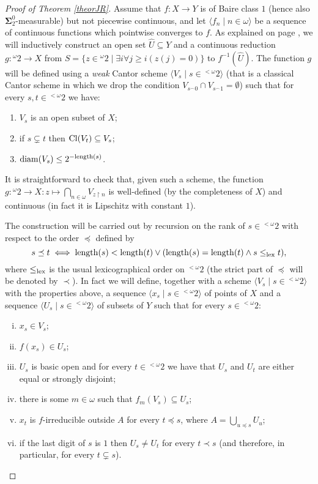 \documentclass{rae}
\def\leng{{\rm length}}
\def\diam{{\rm diam}}
\def\Cl{{\rm Cl}}
\newcommand{\Can}{\ensuremath{{}^\omega 2}}
\newcommand{\conc}{{}^\smallfrown}
\newcommand{\bSigma}{\mathbf{\Sigma}}
\newcommand{\restr}[2]{#1 \restriction #2}
\newcommand{\seq}[2]{\langle #1 \mid  #2 \rangle}
\theoremstyle{definition}
\begin{document}
\begin{proof}[Proof of Theorem \ref{theorJR}]
Assume that $f\colon X \to Y$ is of Baire class $1$ (hence also 
$\bSigma^0_2$-measurable) but not piecewise continuous, and let 
$\seq{f_n}{n \in \omega}$ be a sequence of continuous functions which 
pointwise converges to $f$. As explained on page \pageref{Ug}, we will inductively construct an open set $\hat{U} 
\subseteq Y$ and a continuous reduction $g \colon \Can \to X$ from $S = \{ z \in \Can \mid \exists i \forall j \geq i (z(j)=0)\}$
to $f^{-1}(\hat{U})$.
The function $g$ will be defined using a \emph{weak}
Cantor scheme $\seq{V_s}{s \in {}^{<\omega} 2}$
(that is a classical Cantor scheme in which we drop
the condition $V_{s \conc 0} \cap V_{s \conc 1} = \emptyset$)
 such that for every $s,t \in {}^{<\omega} 2$ we have:
\begin{enumerate}[1)]
\item $V_s$ is an open subset of $X$;
\item if $s \subsetneq 
t$ then $\Cl(V_t) \subseteq V_s$;
\item $\diam(V_s) \leq 2^{-\leng(s)}$.
\end{enumerate}
It is straightforward to check that, given such a scheme, the function $g  
\colon \Can \to X \colon z \mapsto \bigcap_{n \in \omega} 
V_{\restr{z}{n}}$ is well-defined (by the completeness of $X$) 
and continuous (in fact it is 
Lipschitz with constant $1$). 

The construction will be carried out by recursion on the rank of $s 
\in {}^{<\omega}2$ with respect to the order $\preceq$ defined by
\[ s \preceq t \iff \leng(s) < \leng(t) \vee (\leng(s) = \leng(t) \wedge 
s \leq_{\rm lex} t),\]
where $\leq_{\rm lex}$ is the usual lexicographical order on ${}^{<\omega}2$ (the strict part
of $\preceq$ will be denoted by $\prec$). 
In fact we will define, together with a scheme $\seq{V_s}{s \in {}^{<\omega}2}$ 
with the properties above, a sequence $\seq{x_s}{s \in {}^{<\omega}2}$ of points
of $X$ and a sequence $\seq{U_s}{s \in {}^{<\omega}2}$ of subsets of $Y$
such that for 
every $s \in {}^{<\omega}2$:
\begin{enumerate}[i)]
\item $x_s \in V_s$;
\item $f(x_s) \in U_s$;
\item $U_s$ is basic open and for every $t \in {}^{<\omega}2$ we have that 
$U_s$ and $U_t$ are either equal or strongly disjoint;
\item there is some $m \in \omega$ such that $f_m (V_s) \subseteq 
U_s$;
\item $x_t$ is $f$-irreducible outside $A$ for every $t \preceq s$, where 
$A=\bigcup_{u \preceq s} U_{u}$;
\item if the last digit of $s$ is $1$ then $U_s \neq U_t$ for every 
$t \prec s$ 
(and therefore, in particular, for every $t \subsetneq s$).
\end{enumerate}


\end{proof}
\end{document}
